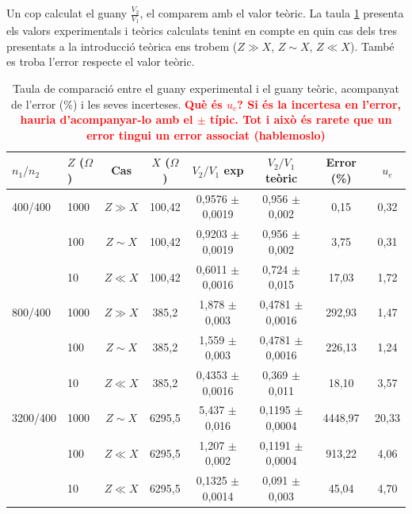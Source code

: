 \documentclass[a4paper,10.5pt]{report}
\begin{document}
Un cop calculat el guany $\frac{V_2}{V_1}$, el comparem amb el valor teòric. La  taula \ref{tab:4.5} presenta els valors experimentals i teòrics calculats tenint en compte en quin cas dels tres presentats a la introducció teòrica ens trobem ($Z \gg X$, $Z \sim X$, $Z\ll X$). També es troba l'error respecte el valor teòric.  

\begin{table}[H]
	\centering
	\renewcommand{\arraystretch}{1.2}
	\caption{Taula de comparació entre el guany experimental i el guany teòric, acompanyat de l'error ($\%$) i les seves incerteses. \textbf{\textcolor{red}{Què és $u_e$? Si és la incertesa en l'error, hauria d'acompanyar-lo amb el $\pm$ típic. Tot i això és rarete que un error tingui un error associat (hablemoslo)}}}
	\begin{tabular}{llcccccc}
		\toprule
		$n_1/n_2$ & $Z$ ($\Omega$) & Cas & $X$ ($\Omega$) & $V_2/V_1$ exp & $V_2/V_1$ teòric & Error (\%) & $u_e$ \\
		\midrule
		400/400 & 1000 & $Z \gg X$ & 100,42 & 0,9576 $\pm$ 0,0019 & 0,956 $\pm$ 0,002 & 0,15 & 0,32 \\
		& 100  & $Z \sim X$ & 100,42 & 0,9203 $\pm$ 0,0019 & 0,956 $\pm$ 0,002 & 3,75 & 0,31 \\
		& 10   & $Z \ll X$ & 100,42 & 0,6011 $\pm$ 0,0016 & 0,724 $\pm$ 0,015 & 17,03 & 1,72 \\
		\midrule
		800/400 & 1000 & $Z \gg X$ & 385,2 & 1,878 $\pm$ 0,003 & 0,4781 $\pm$ 0,0016 & 292,93 & 1,47 \\
		& 100  & $Z \sim X$ & 385,2 & 1,559 $\pm$ 0,003 & 0,4781 $\pm$ 0,0016 & 226,13 & 1,24 \\
		& 10   & $Z \ll X$ & 385,2 & 0,4353 $\pm$ 0,0016 & 0,369 $\pm$ 0,011 & 18,10 & 3,57 \\
		\midrule
		3200/400 & 1000 & $Z \sim X$ & 6295,5 & 5,437 $\pm$ 0,016 & 0,1195 $\pm$ 0,0004 & 4448,97 & 20,33 \\
		& 100  & $Z \ll X$ & 6295,5 & 1,207 $\pm$ 0,002 & 0,1191 $\pm$ 0,0004 & 913,22 & 4,06 \\
		& 10   & $Z \ll X$ & 6295,5 & 0,1325 $\pm$ 0,0014 & 0,091 $\pm$ 0,003 & 45,04 & 4,70 \\
		\bottomrule
	\end{tabular}
	\label{tab:4.5}
\end{table}
\end{document}

